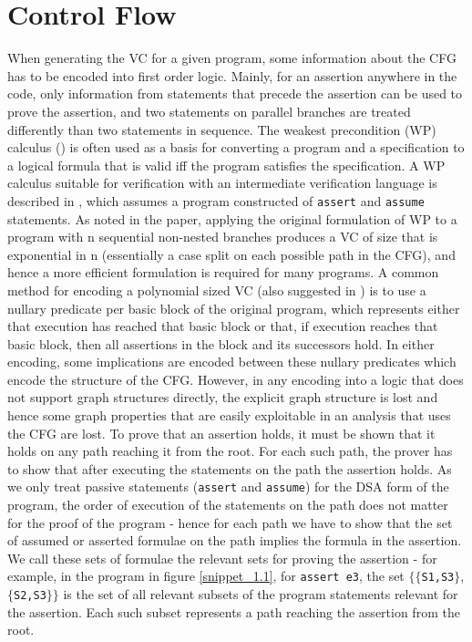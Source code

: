 \section{Control Flow}
When generating the VC for a given program, some information about the CFG has to be encoded into first order logic.
Mainly, for an assertion anywhere in the code, only information from statements that precede the assertion can be used to prove the assertion, and two statements on parallel branches are treated differently than two statements in sequence.
The weakest precondition (WP) calculus (\cite{Dijkstra:1975:GCN:360933.360975}) is often used as a basis for converting a program and a specification to a logical formula that is valid iff the program satisfies the specification. 
A WP calculus suitable for verification with an intermediate verification language is described in \cite{Leino:2005:EWP:1066417.1710882}, which assumes a program constructed of \lstinline|assert| and \lstinline|assume| statements. As noted in the paper, applying the original formulation of WP to a program with n sequential non-nested branches produces a VC of size that is exponential in n (essentially a case split on each possible path in the CFG), and hence a more efficient formulation is required for many programs.
A common method for encoding a polynomial sized VC (also suggested in \cite{Leino:2005:EWP:1066417.1710882}) 
is to use a nullary predicate per basic block of the original program, which represents either that execution has reached that basic block or that, if execution reaches that basic block, then all assertions in the block and its successors hold. 
In either encoding, some implications are encoded between these nullary predicates which encode the structure of the CFG.
However, in any encoding into a logic that does not support graph structures directly, the explicit graph structure is lost and hence some graph properties that are easily exploitable in an analysis that uses the CFG are lost.
To prove that an assertion holds, it must be shown that it holds on any path reaching it from the root.
For each such path, the prover has to show that after executing the statements on the path the assertion holds.
As we only treat passive statements (\lstinline|assert| and \lstinline|assume|) for the DSA form of the program, the order of execution of the statements on the path does not matter for the proof of the program - hence for each path we have to show that the set of assumed or asserted formulae on the path implies the formula in the assertion. We call these sets of formulae the relevant sets for proving the assertion - for example,  in the program in figure \ref{snippet_1.1},
for \lstinline{assert e3}, the set $\{\{$\lstinline{S1,S3}$\}$,$\{$\lstinline{S2,S3}$\}\}$ is the set of all relevant subsets of the program statements relevant for the assertion. Each such subset represents a path reaching the assertion from the root. 


